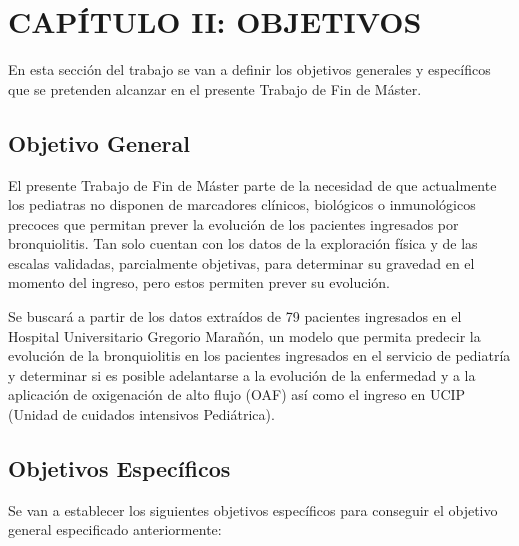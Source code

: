 \section{CAPÍTULO II: OBJETIVOS}\label{sec:objectives}

En esta sección del trabajo se van a definir los objetivos generales y específicos que se pretenden alcanzar en el presente Trabajo de Fin de Máster. 

\subsection{Objetivo General}

El presente Trabajo de Fin de Máster parte de la necesidad de que actualmente los pediatras no disponen de marcadores clínicos, biológicos o inmunológicos precoces que permitan prever la evolución de los pacientes ingresados por bronquiolitis. Tan solo cuentan con los datos de la exploración física y de las escalas validadas, parcialmente objetivas, para determinar su gravedad en el momento del ingreso, pero estos permiten prever su evolución. 

Se buscará a partir de los datos extraídos de 79 pacientes ingresados en el Hospital Universitario Gregorio Marañón, un modelo que permita predecir la evolución de la bronquiolitis en los pacientes ingresados en el servicio de pediatría y determinar si es posible adelantarse a la evolución de la enfermedad y a la aplicación de oxigenación de alto flujo (OAF) así como el ingreso en UCIP (Unidad de cuidados intensivos Pediátrica).

\subsection{Objetivos Específicos}

Se van a establecer los siguientes objetivos específicos para conseguir el objetivo general especificado anteriormente:

